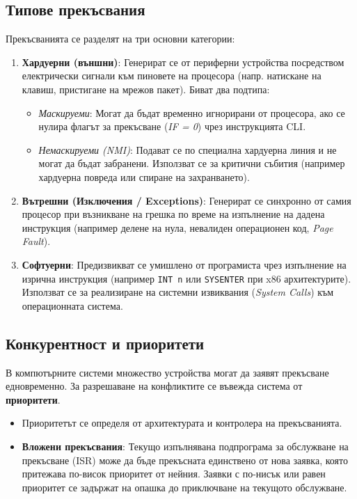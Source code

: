 \documentclass{scrartcl}
\begin{document}
\begin{FlushLeft}
\subsection{Типове прекъсвания}
Прекъсванията се разделят на три основни категории:
\begin{enumerate}
    \item \textbf{Хардуерни (външни)}: Генерират се от периферни устройства посредством електрически сигнали към пиновете на процесора (напр. натискане на клавиш, пристигане на мрежов пакет). Биват два подтипа:
    \begin{itemize}
        \item \textit{Маскируеми}: Могат да бъдат временно игнорирани от процесора, ако се нулира флагът за прекъсване (\textit{IF = 0}) чрез инструкцията CLI.
        \item \textit{Немаскируеми (NMI)}: Подават се по специална хардуерна линия и не могат да бъдат забранени. Използват се за критични събития (например хардуерна повреда или спиране на захранването).
    \end{itemize}
    \item \textbf{Вътрешни (Изключения / Exceptions)}: Генерират се синхронно от самия процесор при възникване на грешка по време на изпълнение на дадена инструкция (например делене на нула, невалиден операционен код, \textit{Page Fault}).
    \item \textbf{Софтуерни}: Предизвикват се умишлено от програмиста чрез изпълнение на изрична инструкция (например \texttt{INT n} или \texttt{SYSENTER} при x86 архитектурите). Използват се за реализиране на системни извиквания (\textit{System Calls}) към операционната система.
\end{enumerate}

\subsection{Конкурентност и приоритети}
В компютърните системи множество устройства могат да заявят прекъсване едновременно. За разрешаване на конфликтите се въвежда система от \textbf{приоритети}. 
\begin{itemize}
    \item Приоритетът се определя от архитектурата и контролера на прекъсванията.
    \item \textbf{Вложени прекъсвания}: Текущо изпълнявана подпрограма за обслужване на прекъсване (ISR) може да бъде прекъсната единствено от нова заявка, която притежава по-висок приоритет от нейния. Заявки с по-нисък или равен приоритет се задържат на опашка до приключване на текущото обслужване.
\end{itemize}


\end{FlushLeft}
\end{document}
